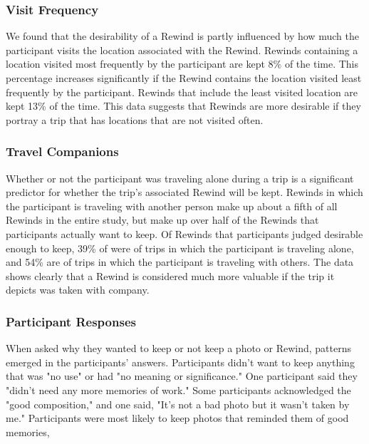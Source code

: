 \documentclass{sigchi}
\begin{document}
\subsubsection{Visit Frequency}
We found that the desirability of a Rewind is partly influenced by how much the participant visits the location associated with the Rewind. Rewinds containing a location visited most frequently by the participant are kept 8\% of the time. This percentage increases significantly if the Rewind contains the location visited least frequently by the participant. Rewinds that include the least visited location are kept 13\% of the time. This data suggests that Rewinds are more desirable if they portray a trip that has locations that are not visited often.

\subsubsection{Travel Companions}
Whether or not the participant was traveling alone during a trip is a significant predictor for whether the trip's associated Rewind will be kept. Rewinds in which the participant is traveling with another person make up about a fifth of all Rewinds in the entire study, but make up over half of the Rewinds that participants actually want to keep. Of Rewinds that participants judged desirable enough to keep, 39\% of were of trips in which the participant is traveling alone, and 54\% are of trips in which the participant is traveling with others. The data shows clearly that a Rewind is considered much more valuable if the trip it depicts was taken with company. 

\subsubsection{Participant Responses}
When asked why they wanted to keep or not keep a photo or Rewind, patterns emerged in the participants' answers. Participants didn't want to keep anything that was "no use" or had "no meaning or significance." One participant said they "didn't need any more memories of work." Some participants acknowledged the "good composition," and one said, "It's not a bad photo but it wasn't taken by me." Participants were most likely to keep photos that reminded them of good memories, 
\end{document}
